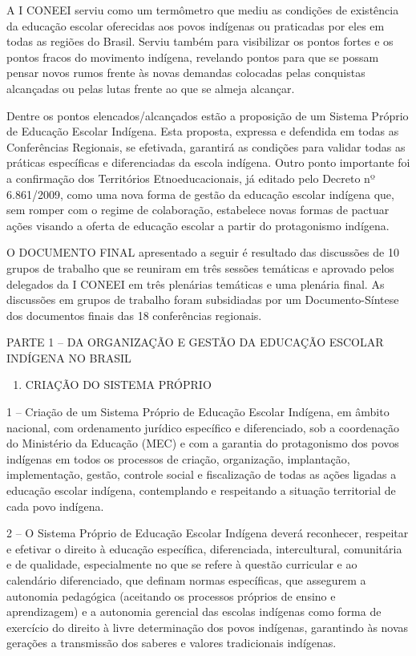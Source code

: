 \documentclass[
]{book}
\providecommand{\tightlist}{%
  \setlength{\itemsep}{0pt}\setlength{\parskip}{0pt}}
\begin{document}
A I CONEEI serviu como um termômetro que mediu as condições de existência da educação escolar oferecidas aos povos indígenas ou praticadas por eles em todas as regiões do Brasil. Serviu também para visibilizar os pontos fortes e os pontos fracos do movimento indígena, revelando pontos para que se possam pensar novos rumos frente às novas demandas colocadas pelas conquistas alcançadas ou pelas lutas frente ao que se almeja alcançar.

Dentre os pontos elencados/alcançados estão a proposição de um Sistema Próprio de Educação Escolar Indígena. Esta proposta, expressa e defendida em todas as Conferências Regionais, se efetivada, garantirá as condições para validar todas as práticas específicas e diferenciadas da escola indígena. Outro ponto importante foi a confirmação dos Territórios Etnoeducacionais, já editado pelo Decreto nº 6.861/2009, como uma nova forma de gestão da educação escolar indígena que, sem romper com o regime de colaboração, estabelece novas formas de pactuar ações visando a oferta de educação escolar a partir do protagonismo indígena.

O DOCUMENTO FINAL apresentado a seguir é resultado das discussões de 10 grupos de trabalho que se reuniram em três sessões temáticas e aprovado pelos delegados da I CONEEI em três plenárias temáticas e uma plenária final. As discussões em grupos de trabalho foram subsidiadas por um Documento-Síntese dos documentos finais das 18 conferências regionais.

PARTE 1 -- DA ORGANIZAÇÃO E GESTÃO DA EDUCAÇÃO ESCOLAR INDÍGENA NO BRASIL

\begin{enumerate}
\def\labelenumi{\Alph{enumi})}
\tightlist
\item
  CRIAÇÃO DO SISTEMA PRÓPRIO
\end{enumerate}

1 -- Criação de um Sistema Próprio de Educação Escolar Indígena, em âmbito nacional, com ordenamento jurídico específico e diferenciado, sob a coordenação do Ministério da Educação (MEC) e com a garantia do protagonismo dos povos indígenas em todos os processos de criação, organização, implantação, implementação, gestão, controle social e fiscalização de todas as ações ligadas a educação escolar indígena, contemplando e respeitando a situação territorial de cada povo indígena.

2 -- O Sistema Próprio de Educação Escolar Indígena deverá reconhecer, respeitar e efetivar o direito à educação específica, diferenciada, intercultural, comunitária e de qualidade, especialmente no que se refere à questão curricular e ao calendário diferenciado, que definam normas específicas, que assegurem a autonomia pedagógica (aceitando os processos próprios de ensino e aprendizagem) e a autonomia gerencial das escolas indígenas como forma de exercício do direito à livre determinação dos povos indígenas, garantindo às novas gerações a transmissão dos saberes e valores tradicionais indígenas.
\end{document}
